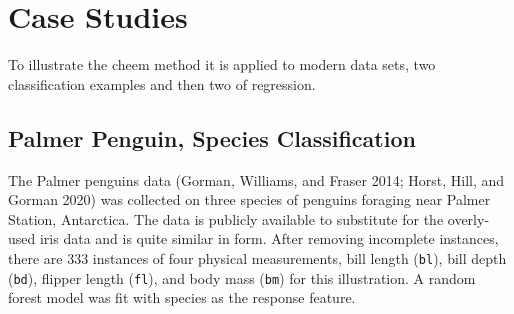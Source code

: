 \documentclass[11pt,twoside]{article}
\begin{document}
\hypertarget{sec:casestudies}{%
\section{Case Studies}\label{sec:casestudies}}

To illustrate the cheem method it is applied to modern data sets, two classification examples and then two of regression.

\hypertarget{palmer-penguin-species-classification}{%
\subsection{Palmer Penguin, Species Classification}\label{palmer-penguin-species-classification}}

The Palmer penguins data (Gorman, Williams, and Fraser 2014; Horst, Hill, and Gorman 2020) was collected on three species of penguins foraging near Palmer Station, Antarctica. The data is publicly available to substitute for the overly-used iris data and is quite similar in form. After removing incomplete instances, there are 333 instances of four physical measurements, bill length (\texttt{bl}), bill depth (\texttt{bd}), flipper length (\texttt{fl}), and body mass (\texttt{bm}) for this illustration. A random forest model was fit with species as the response feature.
\end{document}

